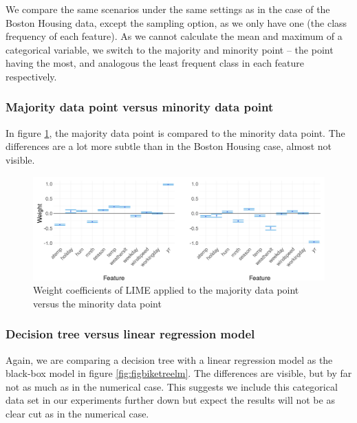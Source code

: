 \documentclass[]{krantz}
\begin{document}
We compare the same scenarios under the same settings as in the case of
the Boston Housing data, except the sampling option, as we only have one
(the class frequency of each feature). As we cannot calculate the mean
and maximum of a categorical variable, we switch to the majority and
minority point -- the point having the most, and analogous the least
frequent class in each feature respectively.

\subsubsection{Majority data point versus minority data
point}\label{majority-data-point-versus-minority-data-point}

In figure \ref{fig:figmajorminor}, the majority data point is compared
to the minority data point. The differences are a lot more subtle than
in the Boston Housing case, almost not visible.

\begin{figure}

{\centering \includegraphics[width=0.99\linewidth]{images/bikes_majVSmin} 

}

\caption{Weight coefficients of LIME applied to the majority data point versus the minority data point}\label{fig:figmajorminor}
\end{figure}

\subsubsection{Decision tree versus linear regression
model}\label{decision-tree-versus-linear-regression-model-1}

Again, we are comparing a decision tree with a linear regression model
as the black-box model in figure \ref{fig:figbiketreelm}. The
differences are visible, but by far not as much as in the numerical
case. This suggests we include this categorical data set in our
experiments further down but expect the results will not be as clear cut
as in the numerical case.
\end{document}
